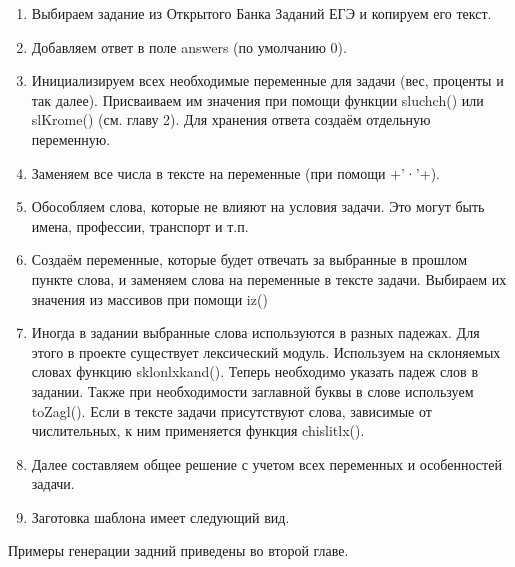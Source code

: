 \begin{enumerate}
    \item Выбираем задание из Открытого Банка Заданий ЕГЭ и копируем его текст.
    \item Добавляем ответ в поле answers (по умолчанию 0).
    \item Инициализируем всех необходимые переменные для задачи (вес, проценты и так далее). Присваиваем им значения при помощи функции sluchch() или slKrome() (см. главу 2). Для хранения ответа создаём отдельную переменную.
    \item Заменяем все числа в тексте на переменные (при помощи +’·’+). 
    \item Обособляем слова, которые не влияют на условия задачи. Это могут быть имена, профессии, транспорт и т.п. 
    \item Создаём переменные, которые будет отвечать за выбранные в прошлом пункте слова, и заменяем слова на переменные в тексте задачи. Выбираем их значения из массивов при помощи iz()
    \item Иногда в задании выбранные слова используются в разных падежах. Для этого в проекте существует лексический модуль. Используем на склоняемых словах функцию sklonlxkand(). Теперь необходимо указать падеж слов в задании. Также при необходимости заглавной буквы в слове используем toZagl(). Если в тексте задачи присутствуют слова, зависимые от числительных, к ним применяется функция chislitlx().
    \item Далее составляем общее решение с учетом всех переменных и особенностей задачи.
    \item Заготовка шаблона имеет следующий вид.
     
\end{enumerate}

Примеры генерации задний приведены во второй главе.
